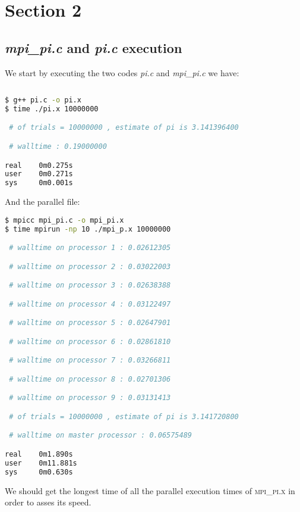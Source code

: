 \documentclass[11pt]{scrartcl} %
\begin{document}
\section{Section 2}

\subsection{\textit{mpi\_pi.c} and \textit{pi.c} execution}
We start by executing the two codes \textit{pi.c} and \textit{mpi\_pi.c} we have:

\begin{lstlisting}[language=bash]
  
$ g++ pi.c -o pi.x
$ time ./pi.x 10000000

 # of trials = 10000000 , estimate of pi is 3.141396400 

 # walltime : 0.19000000 

real    0m0.275s
user    0m0.271s
sys     0m0.001s
\end{lstlisting}
And the parallel file:
\begin{lstlisting}[language=bash]
$ mpicc mpi_pi.c -o mpi_pi.x
$ time mpirun -np 10 ./mpi_p.x 10000000

 # walltime on processor 1 : 0.02612305 

 # walltime on processor 2 : 0.03022003 

 # walltime on processor 3 : 0.02638388 

 # walltime on processor 4 : 0.03122497 

 # walltime on processor 5 : 0.02647901 

 # walltime on processor 6 : 0.02861810 

 # walltime on processor 7 : 0.03266811 

 # walltime on processor 8 : 0.02701306 

 # walltime on processor 9 : 0.03131413 

 # of trials = 10000000 , estimate of pi is 3.141720800 

 # walltime on master processor : 0.06575489 

real    0m1.890s
user    0m11.881s
sys     0m0.630s
\end{lstlisting}

We should get the longest time of all the parallel execution times of \textsc{mpi\_pi.x} in order to asses its speed.
\end{document}
